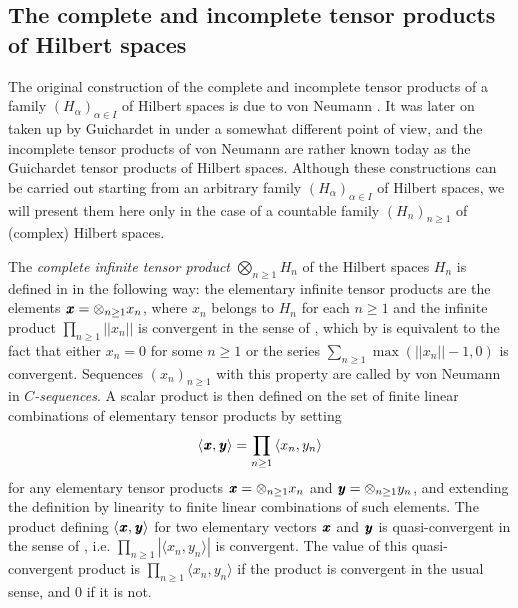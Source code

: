 \documentclass[11pt,english,a4paper]{smfart}
\numberwithin{equation}{section}
\theoremstyle{definition}
\begin{document}
\subsection{The complete and incomplete tensor products of Hilbert 
spaces}
The original construction of the complete and incomplete tensor products 
of a family $(H_{\alpha })_{\alpha \in I}$ of Hilbert spaces is due to von 
Neumann \cite{VN}. It was later on taken up by Guichardet in \cite{Gui} 
under a somewhat different point of view, and the incomplete tensor 
products of von Neumann are rather known today as the Guichardet tensor 
products of Hilbert spaces. Although these constructions can be carried 
out starting from an arbitrary  family $(H_{\alpha })_{\alpha \in I}$ of 
Hilbert spaces, we will present them here only in the case of a countable 
family $({H_{n}})_{n\ge 1}$ of (complex) Hilbert spaces.
\par\smallskip 
The \emph{complete infinite tensor product} ${\bigotimes_{n\ge 1}^{{}}{H_{n}}}$ 
of the Hilbert spaces ${H_{n}} $ is defined in \cite[Part~II,~Ch.~3]{VN} in 
the following way: the elementary infinite tensor products are the elements
${\mkern 1.5 mu\pmb{x}}={{\otimes}_{n\ge 1}{x_{n}}}$, where ${x_{n}}$ belongs to ${H_{n}} $ for each 
${n\ge 1}$  and the infinite product $\prod_{n\ge 1}||{x_{n}}||$ is convergent 
in the sense of \cite[Def.~2.2.1]{VN}, which by \cite[Lem.~2.4.1]{VN} is equivalent to the fact that either $x_{n}=0$ for some $n\ge 1$ or the series $\sum_{n\ge 1}\max(||x_{n}||-1,0)$ is convergent. Sequences 
${({x_{n}})_{n\ge 1}}$ with this property are called by von Neumann in 
\cite{VN} \emph{$C$-sequences}. A scalar product is then defined on the 
set of finite linear combinations of elementary tensor products by setting 
\[
{\ensuremath{{\langle {\mkern 1.5 mu\pmb{x}},{\mkern 1.5 mu\pmb{y}}\rangle}}}=\prod_{n\ge 1}{\ensuremath{{\langle {x_{n}},{y_{n}}\rangle}}}
\]
for any elementary tensor products ${\mkern 1.5 mu\pmb{x}}={{\otimes}_{n\ge 1}{x_{n}}}$ and 
${\mkern 1.5 mu\pmb{y}}={{\otimes}_{n\ge 1}{y_{n}}}$, and extending the definition by linearity to 
finite linear combinations of such elements.
The product defining ${\ensuremath{{\langle {\mkern 1.5 mu\pmb{x}},{\mkern 1.5 mu\pmb{y}}\rangle}}}$ for two elementary vectors ${\mkern 1.5 mu\pmb{x}}$ and ${\mkern 1.5 mu\pmb{y}}$ is quasi-convergent in the sense of \cite[Def.~2.5.1]{VN}, i.e. $\prod_{n\ge 1}|{\ensuremath{{\langle {x_{n}},{y_{n}}\rangle}}}|$ is convergent. The value of this quasi-convergent product is $\prod_{n\ge 1}{\ensuremath{{\langle {x_{n}},{y_{n}}\rangle}}}$ if the product is convergent in the usual sense, and $0$ if it is not.
\end{document}
